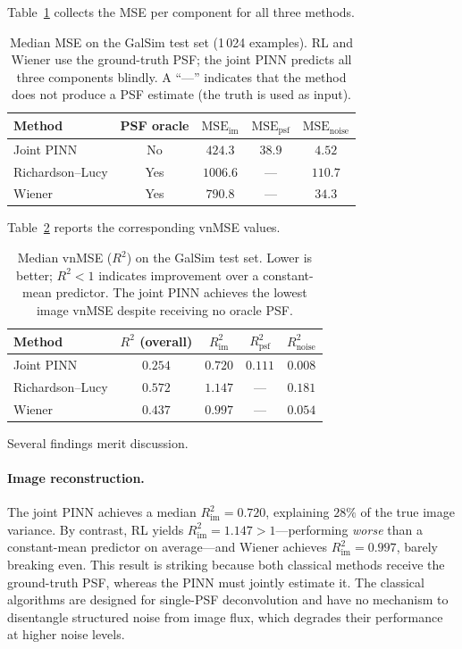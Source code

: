 \documentclass{aa}
\begin{document}
Table~\ref{tab:galsim_mse} collects the MSE per component for all three methods.

\begin{table}[h]
\centering
\begin{tabular}{|l|c|c|c|c|}
\hline
\textbf{Method} & \textbf{PSF oracle} & $\mathrm{MSE}_\mathrm{im}$ & $\mathrm{MSE}_\mathrm{psf}$ & $\mathrm{MSE}_\mathrm{noise}$ \\
\hline
Joint PINN         & No  & $424.3$  & $38.9$  & $4.52$ \\
Richardson--Lucy   & Yes & $1006.6$ & ---     & $110.7$ \\
Wiener             & Yes & $790.8$  & ---     & $34.3$ \\
\hline
\end{tabular}
\caption{Median MSE on the GalSim test set (1\,024 examples). RL and Wiener use the ground-truth PSF; the joint PINN predicts all three components blindly. A ``---'' indicates that the method does not produce a PSF estimate (the truth is used as input).}
\label{tab:galsim_mse}
\end{table}

Table~\ref{tab:galsim_vnmse} reports the corresponding vnMSE values.

\begin{table}[h]
\centering
\begin{tabular}{|l|c|c|c|c|}
\hline
\textbf{Method} & $R^2$ (overall) & $R^2_\mathrm{im}$ & $R^2_\mathrm{psf}$ & $R^2_\mathrm{noise}$ \\
\hline
Joint PINN         & $0.254$  & $0.720$ & $0.111$ & $0.008$ \\
Richardson--Lucy   & $0.572$  & $1.147$ & ---     & $0.181$ \\
Wiener             & $0.437$  & $0.997$ & ---     & $0.054$ \\
\hline
\end{tabular}
\caption{Median vnMSE ($R^2$) on the GalSim test set. Lower is better; $R^2 < 1$ indicates improvement over a constant-mean predictor. The joint PINN achieves the lowest image vnMSE despite receiving no oracle PSF.}
\label{tab:galsim_vnmse}
\end{table}

Several findings merit discussion.

\paragraph{Image reconstruction.} The joint PINN achieves a median $R^2_\mathrm{im} = 0.720$, explaining $28\%$ of the true image variance. By contrast, RL yields $R^2_\mathrm{im} = 1.147 > 1$---performing \emph{worse} than a constant-mean predictor on average---and Wiener achieves $R^2_\mathrm{im} = 0.997$, barely breaking even. This result is striking because both classical methods receive the ground-truth PSF, whereas the PINN must jointly estimate it. The classical algorithms are designed for single-PSF deconvolution and have no mechanism to disentangle structured noise from image flux, which degrades their performance at higher noise levels.
\end{document}
